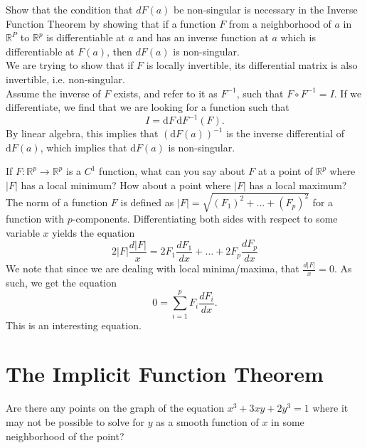 \documentclass[12pt]{book}
\newcommand{\R}{\mathbb{R}}
\newenvironment{exercise}[2][Exercise]{\begin{trivlist}
\item[\hskip \labelsep {\bfseries #1}\hskip \labelsep {\bfseries #2.}]}{\end{trivlist}}
\begin{document}
\begin{exercise}{7.2.7}
\begin{exercise}{9.6.10}
    Show that the condition that $d F(a)$ be non-singular is necessary in the Inverse Function Theorem by showing that if a function $F$ from a neighborhood of $a$ in $\R^P$ to $\R^p$ is differentiable at $a$ and has an inverse function at $a$ which is differentiable at $F(a)$, then $d F(a)$ is non-singular.  \\

    We are trying to show that if $F$ is locally invertible, its differential matrix is also invertible, i.e. non-singular. \\
 Assume the inverse of $F$ exists, and refer to it as $F^{-1}$, such that $F \circ F^{-1} = I$. If we differentiate, we find that we are looking for a function such that
    \[ I = \text{d} F \, \text{d} F^{-1} \left( F \right) . \]
    By linear algebra, this implies that $( \text{d} F(a) )^{-1}$ is the inverse differential of $\text{d} F(a)$, which implies that $\text{d} F(a)$ is non-singular.
\end{exercise}




\begin{exercise}{9.6.12}
    If $F: \R^p \to \R^p$  is a $C^1$ function, what can you say about $F$ at a point of $\R^p$ where $|F|$ has a local minimum? How about a point where $|F|$ has a local maximum?  \\

    The norm of a function $F$ is defined as $|F| = \sqrt{ (F_1)^2 + \hdots + (F_p)^2}$ for a function with $p$-components. Differentiating both sides with respect to some variable $x$ yields the equation
    \[ 2 |F| \frac{d |F|}{x} = 2 F_1 \frac{d F_1}{d x} + \hdots + 2 F_p \frac{d F_p}{d x} \]
    We note that since we are dealing with local minima/maxima, that $\frac{d |F|}{x}=0$. As such, we get the equation
    \[ 0 = \sum_{i=1}^p F_i \frac{d F_i}{dx}. \]
    This is an interesting equation.
\end{exercise}



\section{The Implicit Function Theorem}


\begin{exercise}{9.7.1}
    Are there any points on the graph of the equation $x^3 +3xy+2y^3=1$ where it may not be possible to solve for $y$ as a smooth function of $x$ in some neighborhood of the point?  \\


\end{exercise}
\end{exercise}
\end{document}

